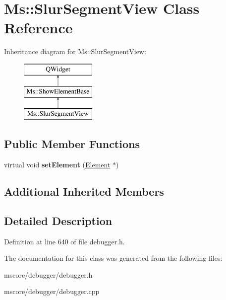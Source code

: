 \hypertarget{class_ms_1_1_slur_segment_view}{}\section{Ms\+:\+:Slur\+Segment\+View Class Reference}
\label{class_ms_1_1_slur_segment_view}
Inheritance diagram for Ms\+:\+:Slur\+Segment\+View\+:\begin{figure}[H]
\begin{center}
\leavevmode
\includegraphics[height=3.000000cm]{class_ms_1_1_slur_segment_view}
\end{center}
\end{figure}
\subsection*{Public Member Functions}
\begin{DoxyCompactItemize}
\item 
\mbox{\label{class_ms_1_1_slur_segment_view_a028654383f8f363496ca03d0e0eef866}} 
virtual void {\bfseries set\+Element} (\hyperlink{class_ms_1_1_element}{Element} $\ast$)
\end{DoxyCompactItemize}
\subsection*{Additional Inherited Members}


\subsection{Detailed Description}


Definition at line 640 of file debugger.\+h.



The documentation for this class was generated from the following files\+:\begin{DoxyCompactItemize}
\item 
mscore/debugger/debugger.\+h\item 
mscore/debugger/debugger.\+cpp\end{DoxyCompactItemize}
